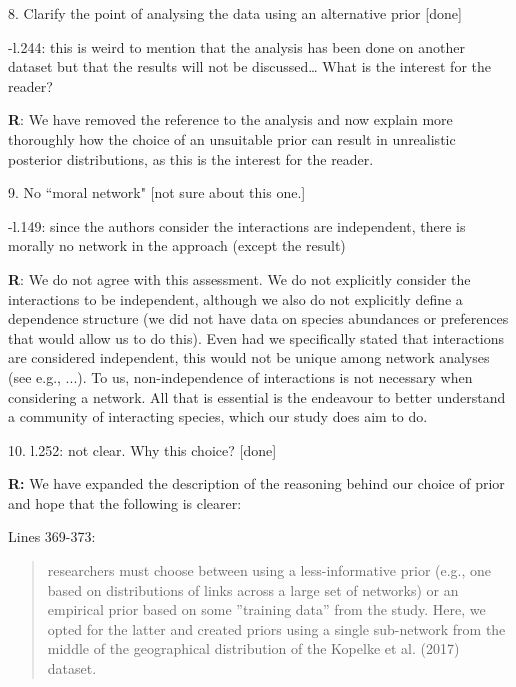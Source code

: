 \documentclass[12pt]{letter}
\newenvironment{refquote}{\bigskip \begin{it}}{\end{it}\smallskip}
\begin{document}
	8. Clarify the point of analysing the data using an alternative prior [done]

		
		\begin{refquote}	
			-l.244: this is weird to mention that the analysis has been done on another dataset but that the results will not be discussed… What is the interest for the reader?
		\end{refquote}


		\textbf{R}: We have removed the reference to the analysis and now explain more thoroughly how the choice of an unsuitable prior can result in unrealistic posterior distributions, as this is the interest for the reader.


	9. No ``moral network" [not sure about this one.]

		\begin{refquote}
			-l.149: since the authors consider the interactions are independent, there is morally no network in the approach (except the result)
		\end{refquote}


		\textbf{R}: We do not agree with this assessment. We do not explicitly consider the interactions to be independent, although we also do not explicitly define a dependence structure (we did not have data on species abundances or preferences that would allow us to do this). Even had we specifically stated that interactions are considered independent, this would not be unique among network analyses (see e.g., ...). To us, non-independence of interactions is not necessary when considering a network. All that is essential is the endeavour to better understand a community of interacting species, which our study does aim to do. 


	10. l.252: not clear. Why this choice? [done]


		\textbf{R:} We have expanded the description of the reasoning behind our choice of prior and hope that the following is clearer:


		Lines 369-373:


		\begin{quotation}
			researchers must choose between using a less-informative prior (e.g., one based on distributions of links across a large set of networks) or an empirical prior based on some ”training data” from the study. Here, we opted for the latter and created priors using a single sub-network from the middle of the geographical distribution of the Kopelke et al. (2017) dataset. 
		\end{quotation}
\end{document}

